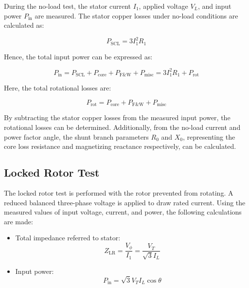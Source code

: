 \documentclass[a4paper,12pt]{article}
\begin{document}
During the no-load test, the stator current \( I_1 \), applied voltage \( V_L \), and input power \( P_{\text{in}} \) are measured. The stator copper losses under no-load conditions are calculated as:

\begin{equation}
	P_{\text{SCL}} = 3 I_1^2 R_1
\end{equation}

Hence, the total input power can be expressed as:

\begin{equation}
	P_{\text{in}} = P_{\text{SCL}} + P_{\text{core}} + P_{\text{F\&W}} + P_{\text{misc}} = 3 I_1^2 R_1 + P_{\text{rot}}
\end{equation}

Here, the total rotational losses are:

\begin{equation}
	P_{\text{rot}} = P_{\text{core}} + P_{\text{F\&W}} + P_{\text{misc}}
\end{equation}

By subtracting the stator copper losses from the measured input power, the rotational losses can be determined. Additionally, from the no-load current and power factor angle, the shunt branch parameters \( R_0 \) and \( X_0 \), representing the core loss resistance and magnetizing reactance respectively, can be calculated.

\subsection{Locked Rotor Test}
The locked rotor test is performed with the rotor prevented from rotating. A reduced balanced three-phase voltage is applied to draw rated current. Using the measured values of input voltage, current, and power, the following calculations are made:

\begin{itemize}
	\item Total impedance referred to stator:
	\begin{equation}
		Z_{\text{LR}} = \frac{V_\phi}{I_1} = \frac{V_T}{\sqrt{3} I_L}
	\end{equation}
	
	\item Input power:
	\begin{equation}
		P_{\text{in}} = \sqrt{3} V_T I_L \cos\theta
	\end{equation}
\end{itemize}
\end{document}
